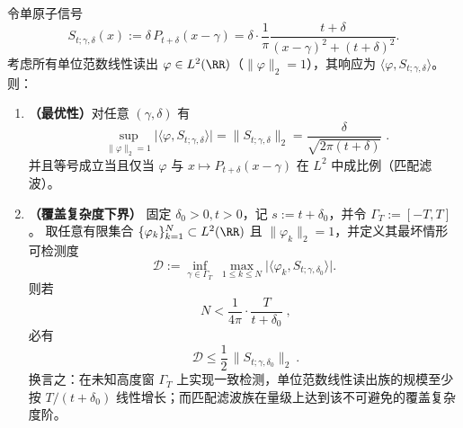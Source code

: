 \begin{theorem}\label{thm:xi-offcritical-poisson-matched-filter-covering}
令单原子信号
\[
S_{t;\gamma,\delta}(x):=\delta\,P_{t+\delta}(x-\gamma)
=\delta\cdot\frac{1}{\pi}\frac{t+\delta}{(x-\gamma)^2+(t+\delta)^2}.
\]
考虑所有单位范数线性读出 \(\varphi\in L^2(\RR)\)（\(\|\varphi\|_2=1\)），其响应为 \(\langle \varphi,S_{t;\gamma,\delta}\rangle\)。
则：
\begin{enumerate}
  \item \textbf{（最优性）}对任意 \((\gamma,\delta)\) 有
  \begin{equation}\label{eq:xi-offcritical-poisson-matched-filter-opt}
  \boxed{\;
  \sup_{\|\varphi\|_2=1}\bigl|\langle \varphi,S_{t;\gamma,\delta}\rangle\bigr|
  =\|S_{t;\gamma,\delta}\|_2
  =\frac{\delta}{\sqrt{2\pi(t+\delta)}}\; }.
  \end{equation}
  并且等号成立当且仅当 \(\varphi\) 与 \(x\mapsto P_{t+\delta}(x-\gamma)\) 在 \(L^2\) 中成比例（匹配滤波）。
  \item \textbf{（覆盖复杂度下界）}
  固定 \(\delta_0>0,t>0\)，记 \(s:=t+\delta_0\)，并令 \(\Gamma_T:=[-T,T]\)。
  取任意有限集合 \(\{\varphi_k\}_{k=1}^{N}\subset L^2(\RR)\) 且 \(\|\varphi_k\|_2=1\)，并定义其最坏情形可检测度
  \[
  \mathcal D
  :=\inf_{\gamma\in\Gamma_T}\ \max_{1\le k\le N}
  \bigl|\langle \varphi_k,S_{t;\gamma,\delta_0}\rangle\bigr|.
  \]
  则若
  \begin{equation}\label{eq:xi-offcritical-poisson-covering-lb}
  \boxed{\;
  N<\frac{1}{4\pi}\cdot\frac{T}{t+\delta_0}\; },
  \end{equation}
  必有
  \[
  \boxed{\ \mathcal D\le \frac12\,\|S_{t;\gamma,\delta_0}\|_2\ }.
  \]
  换言之：在未知高度窗 \(\Gamma_T\) 上实现一致检测，单位范数线性读出族的规模至少按 \(T/(t+\delta_0)\) 线性增长；而匹配滤波族在量级上达到该不可避免的覆盖复杂度阶。
\end{enumerate}
\end{theorem}

